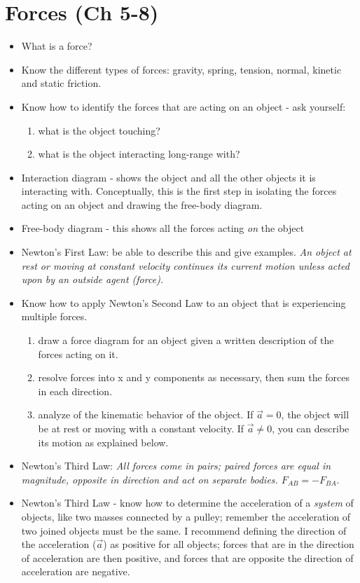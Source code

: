 \vspace*{-.15in}
\section{Forces (Ch 5-8)}
\vspace*{-.15in}
\begin{itemize}
\item What is a force?
\item Know the different types of forces: gravity, spring, tension,
  normal, kinetic and static friction.%
\item Know how to identify the forces that are acting on an object -
  ask yourself:
\begin{enumerate}
\item what is the object touching?
\item what is the object interacting long-range with?
\end{enumerate}
\item Interaction diagram - shows the object and all the other objects
  it is interacting with.  Conceptually, this is the first step in
  isolating the forces acting on an object and drawing the free-body diagram.
\item Free-body diagram - this shows all the forces acting {\em on}
  the object
\item Newton's First Law:  be able to describe this and give examples.  {\it An object at rest or moving at constant velocity continues its current motion unless acted upon by an outside agent (force). }
\item Know how to apply Newton's Second Law to an object that is
  experiencing multiple forces.
\begin{enumerate}
\item draw a force diagram for an object given a written description of the forces acting on it. 
\item resolve forces into x and y components as necessary, then sum
  the forces in each direction.  
\item analyze of the kinematic behavior of the object.  If $\vec{a} =
  0$, the object will be at rest or moving with a constant velocity.
  If $\vec{a} \neq 0$, you can describe its motion as explained below.
\end{enumerate}

\item Newton's Third Law: {\it All forces come in pairs; paired forces
    are equal in magnitude, opposite in direction and act on separate
    bodies.  $F_{AB} = -F_{BA}$}.  
\item Newton's Third Law - know how to determine the acceleration of a {\em
    system} of objects, like two masses connected by a pulley;
  remember the acceleration of two joined objects must be the same.  I
  recommend defining the direction of the acceleration ($\vec{a}$) as
  positive for all objects; forces that are in the direction of acceleration
  are then positive, and forces that are opposite the direction of
  acceleration are negative.



\end{itemize}
